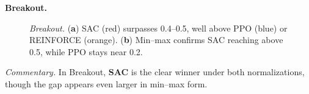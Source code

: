 \noindent \textbf{Breakout.}
\begin{figure} 
	\centering
	\quad
	\caption{\emph{Breakout.}
		(\textbf{a}) SAC (red) surpasses 0.4--0.5, well above PPO (blue) or REINFORCE (orange).
		(\textbf{b}) Min--max confirms SAC reaching above 0.5, while PPO stays near 0.2.}
	\label{fig:breakout_combined}
\end{figure}

\noindent
\emph{Commentary.} In Breakout, \textbf{SAC} is the clear winner under both normalizations, though the gap appears even larger in min--max form.

\medskip

